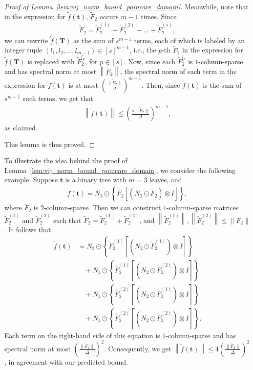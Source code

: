 \documentclass[superscriptaddress,onecolumn,nofootinbib,longbibliography,a4paper,accepted=2026-09-29]{quantumarticle}
\theoremstyle{plain}
\theoremstyle{definition}
\numberwithin{thm}{section}
\numberwithin{assumption}{section}
\numberwithin{lemma}{section}
\numberwithin{prop}{section}
\numberwithin{cor}{section}
\numberwithin{definition}{section}
\numberwithin{rmk}{section}
\numberwithin{equation}{section}
\newcommand{\norm}[1]     {\left\| #1 \right\|}
\newcommand{\lrb}[1]{\left ( #1 \right )}
\newcommand{\lrsb}[1]{\left [ #1 \right ]}
\newcommand{\lrcb}[1]{\left \{ #1 \right \}}
\newcommand{\mbt}{\mathbf{t}}
\newcommand{\mbf}{\mathbf{T}}
\begin{document}
\begin{proof}[Proof of Lemma~\ref{lem:vij_norm_bound_poincare_domain}]
Meanwhile, note that in the expression for $\tilde{f}(\mbt)$, $\tilde{F}_2$ occurs $m-1$ times. Since
\begin{align}
\tilde{F}_2= \tilde{F}_2^{(1)} + \tilde{F}_2^{(2)} + \dots + \tilde{F}_2^{(s)},
\end{align}
we can rewrite $\tilde{f}(\mbf)$ as the sum of $s^{m-1}$ terms, each of which is labeled by an integer tuple $(l_1,l_2,\dots,l_{m-1}) \in [s]^{m-1}$, i.e., the $p$-th $\tilde{F}_2$ in the expression for $\tilde{f}(\mbf)$ is replaced with $\tilde{F}_2^{l_p}$, for $p \in [s]$. Now, since each $\tilde{F}_2^{l_p}$ is $1$-column-sparse and has spectral norm at most $\norm{\tilde{F}_2}$, the spectral norm of each term in the expression for $\tilde{f}(\mbt)$ is at most \(\left( \frac{\| \tilde{F}_2 \|}{\Delta} \right)^{m-1} \). Then, since $\tilde{f}(\mbt)$ is the sum of $s^{m-1}$ such terms, we get that 
\begin{align}
\norm{\tilde{f}(\mbt)} \le \left( \frac{s\| \tilde{F}_2 \|}{\Delta} \right)^{m-1},    
\end{align}
as claimed.

This lemma is thus proved.
\end{proof}

To illustrate the idea behind the proof of Lemma~\ref{lem:vij_norm_bound_poincare_domain}, we consider the following example.
Suppose $\mbt$ is a binary tree with $m=3$ leaves, and 
\begin{align}
    \tilde{f}(\mbt)=N_3 \odot \lrcb{\tilde{F}_2 \lrsb{\lrb{N_2 \odot \tilde{F}_2} \otimes I}},    
\end{align}
where $\tilde{F}_2$ is $2$-column-sparse. Then we can construct $1$-column-sparse matrices $\tilde{F}_2^{(1)}$ and $\tilde{F}_2^{(2)}$ such that $\tilde{F}_2=\tilde{F}_2^{(1)}+\tilde{F}_2^{(2)}$, and  
$\norm{\tilde{F}_2^{(1)}}, \norm{\tilde{F}_2^{(2)}} \le \norm{F_2}$. It follows that 
\begin{align}
\tilde{f}(\mbt)&=N_3 \odot \lrcb{\tilde{F}_2^{(1)} \lrsb{\lrb{N_2 \odot \tilde{F}_2^{(1)}} \otimes I}}   \nonumber \\
&\quad +N_3 \odot \lrcb{\tilde{F}_2^{(1)} \lrsb{\lrb{N_2 \odot \tilde{F}_2^{(2)}} \otimes I}} \nonumber \\
&\quad +N_3 \odot \lrcb{\tilde{F}_2^{(2)} \lrsb{\lrb{N_2 \odot \tilde{F}_2^{(1)}} \otimes I}} \nonumber \\
&\quad +N_3 \odot \lrcb{\tilde{F}_2^{(2)} \lrsb{\lrb{N_2 \odot \tilde{F}_2^{(2)}} \otimes I}}.
\end{align}
Each term on the right-hand side of this equation is $1$-column-sparse and has spectral norm at most $\left( \frac{\| \tilde{F}_2 \|}{\Delta} \right)^{2}$. Consequently, we get $\norm{\tilde{f}(\mbt)} \le 4\left( \frac{\| \tilde{F}_2 \|}{\Delta} \right)^{2}$, in agreement with our predicted bound.
\end{document}

